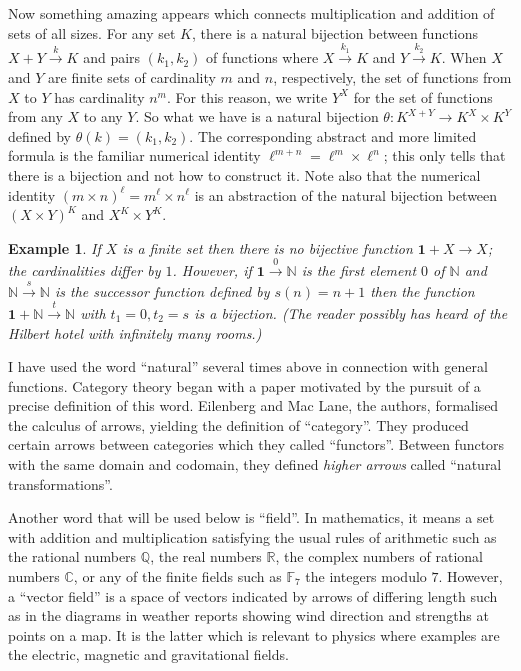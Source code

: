 \documentclass[a4paper,12pt]{article}
\newtheorem{example}[theorem]{Example}
\theoremstyle{step}
\newcommand{\xra}{\xrightarrow}
\begin{document}
Now something amazing appears which connects multiplication and addition of sets of all sizes. 
For any set $K$, there is a natural bijection between functions $X+Y\xra{k} K$ and pairs 
$(k_1,k_2)$ of functions where $X\xra{k_1}K$ and $Y\xra{k_2} K$. When $X$ and $Y$ are finite
sets of cardinality $m$ and $n$, respectively, the set of functions from $X$ to $Y$ has cardinality
$n^m$. For this reason, we write $Y^X$ for the set of functions from any $X$ to any $Y$. So what we
have is a natural bijection $\theta : K^{X+Y}\to K^X\times K^Y$ defined by $\theta(k) = (k_1,k_2)$.
The corresponding abstract and more limited formula is the familiar numerical identity $\ell^{m+n} = \ell^m\times \ell^n$; this only tells that there is a bijection and not how to construct it. Note also
that the numerical identity $(m\times n)^{\ell} = m^{\ell}\times n^{\ell}$ is an abstraction of the 
natural bijection between $(X\times Y)^K$ and $X^K\times Y^K$.

\begin{example}\label{infnatnumbers} If $X$ is a finite set then there is no bijective function $\mathbf{1}+X\to X$; the cardinalities differ by $1$. However, if $\mathbf{1}\xra{0}\mathbb{N}$ is the first element $0$ of 
$\mathbb{N}$ and $\mathbb{N}\xra{s}\mathbb{N}$ is the {\em successor function} defined by 
$s(n) = n+1$ then the function $\mathbf{1}+\mathbb{N}\xra{t}\mathbb{N}$ with $t_1=0, t_2= s$
is a bijection. (The reader possibly has heard of the {\em Hilbert hotel} with infinitely many rooms.)  
\end{example}

I have used the word ``natural'' several times above in connection with general functions. Category theory began with a paper \cite{EilMac} motivated by the pursuit of a precise definition of this word. Eilenberg and Mac Lane, the authors, formalised the calculus of arrows, yielding the definition of 
``category''. They produced certain arrows between categories which they called ``functors''.
Between functors with the same domain and codomain, they defined {\em higher arrows} called ``natural transformations''.   

Another word that will be used below is ``field''. In mathematics, it means a set with 
addition and multiplication satisfying the usual rules of arithmetic such as the rational numbers 
$\mathbb{Q}$, the real numbers $\mathbb{R}$, the complex numbers of rational numbers 
$\mathbb{C}$, or any of the finite fields such as $\mathbb{F}_7$ the integers modulo $7$. 
However, a ``vector field''
is a space of vectors indicated by arrows of differing length such as in the diagrams in weather reports
showing wind direction and strengths at points on a map. It is the latter which is relevant to physics where
examples are the electric, magnetic and gravitational fields. 
\end{document}
